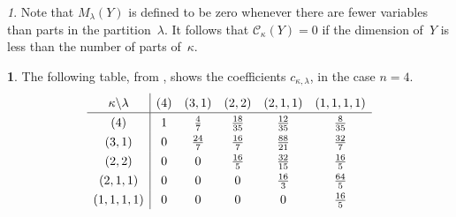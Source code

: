 \documentclass{mathincs}
\numberwithin{equation}{section}
\numberwithin{figure}{section}
\theoremstyle{plain}
\theoremstyle{definition}
\theoremstyle{remark}
\newtheorem{rem}[thm]{\protect\remarkname}
\theoremstyle{plain}
\theoremstyle{definition}
\newtheorem{example}[thm]{\protect\examplename}
\theoremstyle{plain}
\theoremstyle{plain}
\providecommand{\examplename}{Example}
\providecommand{\remarkname}{Remark}
\begin{document}
\begin{rem}\label{rem:polyzero}
  Note that $M_\lambda(Y)$ is defined to be zero whenever there are fewer
  variables than parts in the partition~$\lambda$. It follows that
  $\mathcal{C}_{\kappa}(Y)=0$ if the dimension of~$Y$ is less than the
  number of parts of~$\kappa$.
\end{rem}
\begin{example}\label{Tables}
The following table, from \cite[p.~238]{Muirhead}, shows
the coefficients $c_{\kappa,\lambda}$, in the case $n=4$.
\[
\def\arraystretch{1.3}
\begin{array}{c|ccccc}
\kappa\backslash\lambda & \left(4\right) & \left(3,1\right) & \left(2,2\right) & \left(2,1,1\right) & \left(1,1,1,1\right)\\ \hline
\left(4\right) & 1 & \frac{4}{7} & \frac{18}{35} & \frac{12}{35} & \frac{8}{35}\\
\left(3,1\right) & 0 & \frac{24}{7} & \frac{16}{7} & \frac{88}{21} & \frac{32}{7}\\
\left(2,2\right) & 0 & 0 & \frac{16}{5} & \frac{32}{15} & \frac{16}{5}\\
\left(2,1,1\right) & 0 & 0 & 0 & \frac{16}{3} & \frac{64}{5}\\
\left(1,1,1,1\right) & 0 & 0 & 0 & 0 & \frac{16}{5}
\end{array}
\]

\end{example}
\end{document}

